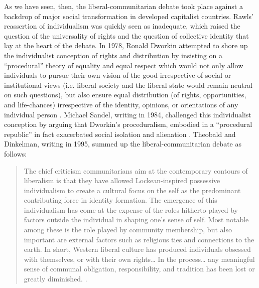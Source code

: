 \documentclass[12pt,oneside]{memoir}
\begin{document}
As we have seen, then, the liberal-communitarian debate took place against a backdrop of major social transformation in developed capitalist countries. Rawls' reassertion of individualism was quickly seen as inadequate, which raised the question of the universality of rights and the question of collective identity that lay at the heart of the debate. In 1978, Ronald Dworkin attempted to shore up the individualist conception of rights and distribution by insisting on a ``procedural'' theory of equality and equal respect which would not only allow individuals to pursue their own vision of the good irrespective of social or institutional views (i.e. liberal society and the liberal state would remain neutral on such questions), but also ensure equal distribution (of rights, opportunities, and life-chances) irrespective of the identity, opinions, or orientations of any individual person \citep{Dworkin1978}. Michael Sandel, writing in 1984, challenged this individualist conception by arguing that Dworkin's proceduralism, embodied in a ``procedural republic'' in fact exacerbated social isolation and alienation \citep{Sandel1984}. 
Theobald and Dinkelman, writing in 1995, summed up the liberal-communitarian debate as follows:
	\begin{quote}
	
	The chief criticism communitarians aim at the contemporary contours of liberalism is that they have allowed Lockean-inspired possessive individualism to create a cultural focus on the self as the predominant contributing force in identity formation. The emergence of this individualism has come at the expense of the roles hitherto played by factors outside the individual in shaping one's sense of self. Most notable among these is the role played by community membership, but also important are external factors such as religious ties and connections to the earth. In short, Western liberal culture has produced individuals obsessed with themselves, or with their own rights{\ldots} In the process{\ldots} any meaningful sense of communal obligation, responsibility, and tradition has been lost or greatly diminished. \cite[2-3]{TheobaldDinkelman1995}.

	\end{quote}
\end{document}
